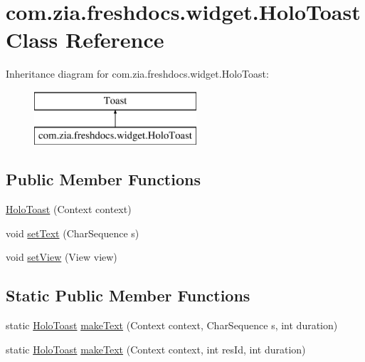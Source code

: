 \hypertarget{classcom_1_1zia_1_1freshdocs_1_1widget_1_1_holo_toast}{\section{com.\-zia.\-freshdocs.\-widget.\-Holo\-Toast Class Reference}
\label{classcom_1_1zia_1_1freshdocs_1_1widget_1_1_holo_toast}
}
Inheritance diagram for com.\-zia.\-freshdocs.\-widget.\-Holo\-Toast\-:\begin{figure}[H]
\begin{center}
\leavevmode
\includegraphics[height=2.000000cm]{classcom_1_1zia_1_1freshdocs_1_1widget_1_1_holo_toast}
\end{center}
\end{figure}
\subsection*{Public Member Functions}
\begin{DoxyCompactItemize}
\item 
\hyperlink{classcom_1_1zia_1_1freshdocs_1_1widget_1_1_holo_toast_af7a4e33b682591abedf7de10bef9d216}{Holo\-Toast} (Context context)
\item 
void \hyperlink{classcom_1_1zia_1_1freshdocs_1_1widget_1_1_holo_toast_a310a62929bb5415b6fc70191f211d9cd}{set\-Text} (Char\-Sequence s)
\item 
void \hyperlink{classcom_1_1zia_1_1freshdocs_1_1widget_1_1_holo_toast_a6238ba6c11f36278211db2ef6b0d1413}{set\-View} (View view)
\end{DoxyCompactItemize}
\subsection*{Static Public Member Functions}
\begin{DoxyCompactItemize}
\item 
static \hyperlink{classcom_1_1zia_1_1freshdocs_1_1widget_1_1_holo_toast}{Holo\-Toast} \hyperlink{classcom_1_1zia_1_1freshdocs_1_1widget_1_1_holo_toast_ab147e5c19c02797c892ad8b1f30d7ddc}{make\-Text} (Context context, Char\-Sequence s, int duration)
\item 
static \hyperlink{classcom_1_1zia_1_1freshdocs_1_1widget_1_1_holo_toast}{Holo\-Toast} \hyperlink{classcom_1_1zia_1_1freshdocs_1_1widget_1_1_holo_toast_a1cd284e060ad50f0248ee3fa17581f76}{make\-Text} (Context context, int res\-Id, int duration)
\end{DoxyCompactItemize}


